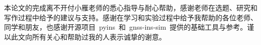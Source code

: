\begin{acknowledgement}
    本论文的完成离不开付小雁老师的悉心指导与耐心帮助，感谢老师在选题、研究和写作过程中给予的建议与支持。感谢在学习和实验过程中给予我帮助的各位老师、同学和朋友，也感谢开源项目 \,pyins\, 和 \,gnss-ins-sim\, 提供的基础工具与参考。谨以此文向所有关心和帮助过我的人表示诚挚的谢意。
\end{acknowledgement}